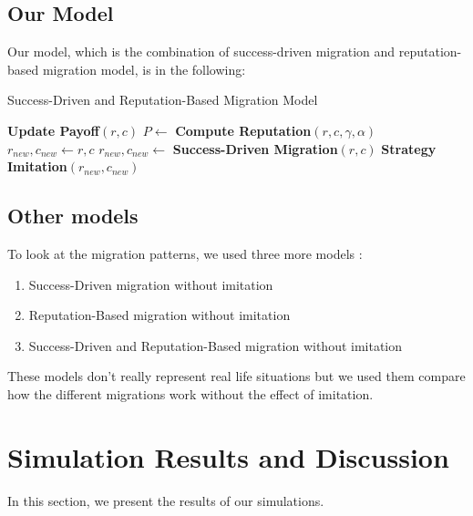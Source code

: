 \documentclass[11pt]{article}
\begin{document}
\subsection{Our Model}
Our model, which is the combination of success-driven migration and reputation-based migration model, is in the following:

\begin{algorithm}[H]
  \caption{Success-Driven and Reputation-Based Migration Model}\label{ourmodel}
	\begin{algorithmic}[1]
			
			\State \textbf{Update Payoff$(r,c)$}
			\State $P \gets$ \textbf{Compute Reputation$(r,c,\gamma,\alpha)$}
			\State $r_{new},c_{new} \gets r,c$
				
				\State $r_{new},c_{new} \gets$ \textbf{Success-Driven Migration$(r,c)$}
			\EndIf
			\State \textbf{Strategy Imitation$(r_{new},c_{new})$}
		\EndFor      
		\EndFor      
    \EndProcedure
	\end{algorithmic}
\end{algorithm}

\subsection{Other models}
To look at the migration patterns, we used three more models :
\begin{enumerate}
\item Success-Driven migration without imitation
\item Reputation-Based migration without imitation
\item Success-Driven and Reputation-Based migration without imitation
\end{enumerate}

These models don't really represent real life situations but we used them compare how the different migrations work without the effect of imitation.

\newpage
\section{Simulation Results and Discussion}
In this section, we present the results of our simulations. 
\end{document}
